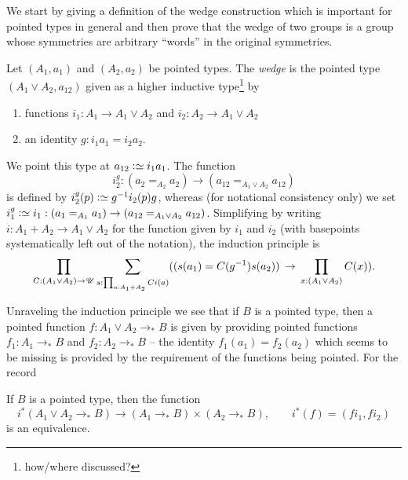 
We start by giving a definition of the wedge construction which is important for pointed types in general and then prove that the wedge of two groups is a group whose symmetries are arbitrary ``words'' in the original symmetries.

\begin{definition}
  \label{def:wedge}
  Let $(A_1,a_1)$ and $(A_2,a_2)$ be pointed types.  The \emph{wedge} is the pointed type $(A_1\vee A_2,a_{12})$ given as a higher inductive type\footnote{how/where discussed?} by
  \begin{enumerate}
  \item functions $i_1:A_1\to A_1\vee A_2$ and $i_2:A_2\to A_1\vee A_2$
  \item an identity $g:i_1a_1=i_2a_2$.
  \end{enumerate}
We point this type at $a_{12}\defequi i_1a_1$.
  The function 
$$i^g_2:(a_2=_{A_2}a_2)\to(a_{12}=_{A_1\vee A_2}a_{12})$$ 
is defined by $i^g_2(p)\defequi g^{-1}i_2(p)g$, whereas (for notational consistency only) we set $i_1^g\defequi i_1:(a_1=_{A_1}a_1)\to(a_{12}=_{A_1\vee A_2}a_{12})$.
Simplifying by writing $i:A_1+A_2\to A_1\vee A_2$ for the function given by $i_1$ and $i_2$ (with basepoints systematically left out of the notation), 
the induction principle is
$$\prod_{C:(A_1\vee A_2)\to\UU}\sum_{s:\prod_{a:A_1+A_2}Ci(a)}%
((s(a_1)=C(g^{-1})s(a_2))\,\to\,\prod_{x:(A_1\vee A_2)}C(x)).$$
\end{definition}


Unraveling the induction principle we see that if $B$ is a pointed type, then a  pointed function $f:A_1\vee A_2\to_* B$ is given by providing pointed functions $f_1:A_1\to_* B$ and $f_2:A_2\to_* B$  -- the identity $f_1(a_1)=f_2(a_2)$ which seems to be missing is provided by the requirement of the functions being pointed.  For the record
\begin{lemma}
  \label{lem:univvee}
  If $B$ is a pointed type, then the function 
  $$i^*(A_1\vee A_2\to_*B)\to(A_1\to_*B)\times(A_2\to_*B),\qquad i^*(f)=(fi_1,fi_2)
$$
is an equivalence.
\end{lemma}

